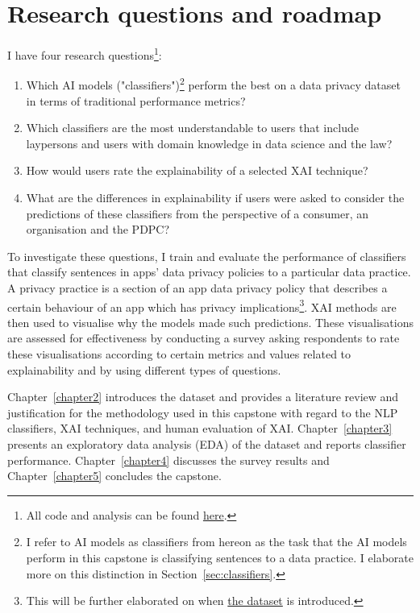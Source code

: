 \section{Research questions and roadmap}
\label{chap1:research_questions}
I have four research questions\footnote{All code and analysis can be found \href{https://github.com/TristanKoh/capstone-repo/}{here}.}: 

\begin{enumerate}
  \item Which AI models ("classifiers")\footnote{I refer to AI models as classifiers from hereon as the task that the AI models perform in this capstone is classifying sentences to a data practice. I elaborate more on this distinction in Section~\ref{sec:classifiers}.} perform the best on a data privacy dataset in terms of traditional performance metrics?
  \item Which classifiers are the most understandable to users that include laypersons and users with domain knowledge in data science and the law?
  \item How would users rate the explainability of a selected XAI technique?
  \item What are the differences in explainability if users were asked to consider the predictions of these classifiers from the perspective of a consumer, an organisation and the PDPC?
\end{enumerate}

To investigate these questions, I train and evaluate the performance of classifiers that classify sentences in apps' data privacy policies to a particular data practice. A privacy practice is a section of an app data privacy policy that describes a certain behaviour of an app which has privacy implications\footnote{This will be further elaborated on when \hyperref[app350_corpus]{the dataset} is introduced.}. XAI methods are then used to visualise why the models made such predictions. These visualisations are assessed for effectiveness by conducting a survey asking respondents to rate these visualisations according to certain metrics and values related to explainability and by using different types of questions.

Chapter~\ref{chapter2} introduces the dataset and provides a literature review and justification for the methodology used in this capstone with regard to the NLP classifiers, XAI techniques, and human evaluation of XAI. Chapter~\ref{chapter3} presents an exploratory data analysis (EDA) of the dataset and reports classifier performance. Chapter~\ref{chapter4} discusses the survey results and Chapter~\ref{chapter5} concludes the capstone.